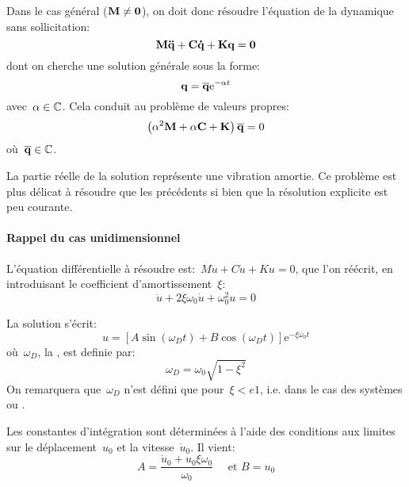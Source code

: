 Dans le cas général ($\MM{M}\ne\MM{0}$), on doit donc résoudre l'équation de la dynamique sans sollicitation:
\begin{equation} \MM{M}\VV{\ddot{q}}+\MM{C}\VV{\dot{q}}+\MM{K}\VV{q}=\VV{0} \end{equation}
dont on cherche une solution générale sous la forme:
\begin{equation} \VV{q}=\VV{\overline{q}}\mathrm{e}^{-\alpha t} \end{equation}
avec~$\alpha\in\mathbb C$.
Cela conduit au problème de valeurs propres:
\begin{equation} \left(\alpha^2\MM{M}+\alpha\MM{C}+\MM{K}\right)\VV{\overline{q}}=0\end{equation}
où~$\VV{\overline{q}}\in\CC$.

La partie réelle de la solution représente une vibration amortie. Ce problème est plus délicat à résoudre que les précédents si bien que la résolution explicite est peu courante.

\medskip
{}
\paragraph{Rappel du cas unidimensionnel}
L'équation différentielle à résoudre est:~$M\ddot{u}+C\dot{u}+Ku=0$, que l'on
réécrit, en introduisant le coefficient d'amortissement~$\xi$:
\begin{equation}\ddot{u}+2\xi\omega_0\dot{u}+\omega^2_0 u=0\end{equation}

La solution s'écrit: \begin{equation} u=\left[A\sin (\omega_D t)+B\cos(\omega_D t)\right] \mathrm{e}^{-\xi\omega_0t} \end{equation}
où~$\omega_D$, la , est definie par:
\begin{equation}\omega_D=\omega_0\sqrt{1-\xi^2}\end{equation}
On remarquera que~$\omega_D$ n'est défini que pour~$\xi<e1$, i.e.
dans le cas des systèmes  ou .

Les constantes d'intégration sont déterminées à l'aide des conditions aux limites sur le déplacement~$u_0$ et la
vitesse~$\dot{u}_0$. Il vient: \begin{equation} A=\dfrac{\dot{u}_0+u_0\xi\omega_0}{\omega_0} \quad \text{ et } B=u_0\end{equation}

